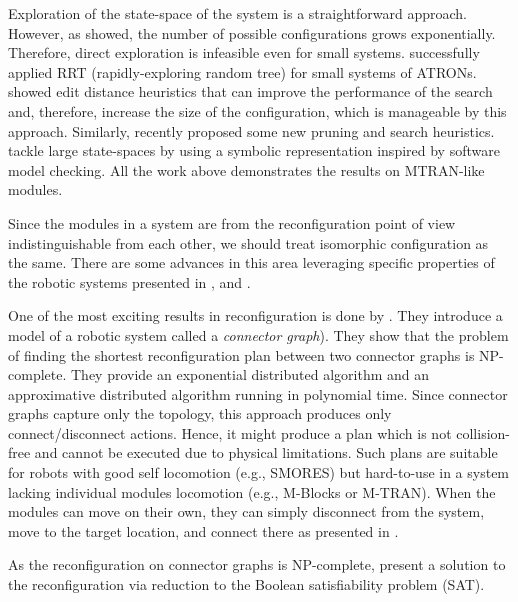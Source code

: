 Exploration of the state-space of the system is a straightforward approach.
However, as \textcite{DBLP:journals/jfr/ChirikjianPE96} showed, the number of
possible configurations grows exponentially. Therefore, direct exploration is
infeasible even for small systems. \textcite{DBLP:conf/iros/Brandt06}
successfully applied RRT (rapidly-exploring random tree) for small systems of
ATRONs. \textcite{DBLP:conf/iros/AsadpourASI09} showed edit distance heuristics
that can improve the performance of the search and, therefore, increase the size
of the configuration, which is manageable by this approach. Similarly,
\textcite{DBLP:journals/ral/KhodrMHBI19} recently proposed some new pruning and
search heuristics. \textcite{DBLP:conf/monterey/BaarirHKR10} tackle large
state-spaces by using a symbolic representation inspired by software model
checking. All the work above demonstrates the results on MTRAN-like modules.

Since the modules in a system are from the reconfiguration point of view
indistinguishable from each other, we should treat isomorphic configuration as
the same. There are some advances in this area leveraging specific properties of
the robotic systems presented in \textcite{DBLP:journals/ijrr/ParkCTY08},
\textcite{DBLP:conf/iros/AsadpourASI09} and
\textcite{DBLP:journals/ras/TaheriMAP16}.

One of the most exciting results in reconfiguration is done by
\textcite{DBLP:journals/ras/HouS14}. They introduce a model of a robotic system
called a \emph{connector graph}). They show that the problem of finding the
shortest reconfiguration plan between two connector graphs is NP-complete. They
provide an exponential distributed algorithm and an approximative
distributed algorithm running in polynomial time. Since
connector graphs capture only the topology, this approach produces only
connect/disconnect actions. Hence, it might produce a plan which is not
collision-free and cannot be executed due to physical limitations. Such plans
are suitable for robots with good self locomotion (e.g., SMORES) but hard-to-use
in a system lacking individual modules locomotion (e.g., M-Blocks or M-TRAN).
When the modules can move on their own, they can simply disconnect from the
system, move to the target location, and connect there as presented in
\cite{DBLP:journals/ral/LiuWY19}.

As the reconfiguration on connector graphs is NP-complete,
\textcite{DBLP:journals/pcs/GorbenkoP12} present a solution to the
reconfiguration via reduction to the Boolean satisfiability problem (SAT).

